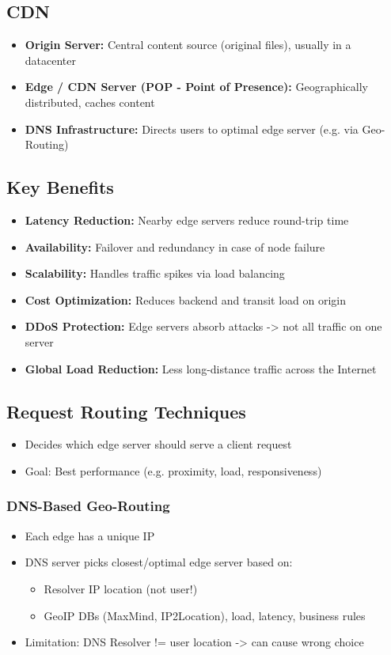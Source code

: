 \begin{multicols*}{5}
		\section{CDN}
		\begin{itemize}
			\item \textbf{Origin Server:} Central content source (original files), usually in a datacenter
			\item \textbf{Edge / CDN Server (POP - Point of Presence):} Geographically distributed, caches content
			\item \textbf{DNS Infrastructure:} Directs users to optimal edge server (e.g. via Geo-Routing)
		\end{itemize}
		\subsection{Key Benefits}
		\begin{itemize}
			\item \textbf{Latency Reduction:} Nearby edge servers reduce round-trip time
			\item \textbf{Availability:} Failover and redundancy in case of node failure
			\item \textbf{Scalability:} Handles traffic spikes via load balancing
			\item \textbf{Cost Optimization:} Reduces backend and transit load on origin
			\item \textbf{DDoS Protection:} Edge servers absorb attacks -> not all traffic on one server
			\item \textbf{Global Load Reduction:} Less long-distance traffic across the Internet
		\end{itemize}
		\subsection{Request Routing Techniques}
		\begin{itemize}
			\item Decides which edge server should serve a client request
			\item Goal: Best performance (e.g. proximity, load, responsiveness)
		\end{itemize}
		
		\subsubsection{DNS-Based Geo-Routing}
		\begin{itemize}
			\item Each edge has a unique IP
			\item DNS server picks closest/optimal edge server based on:
			\begin{itemize}
				\item Resolver IP location (not user!)
				\item GeoIP DBs (MaxMind, IP2Location), load, latency, business rules
			\end{itemize}
			\item Limitation: DNS Resolver != user location -> can cause wrong choice
		\end{itemize}
		

\end{multicols*}
